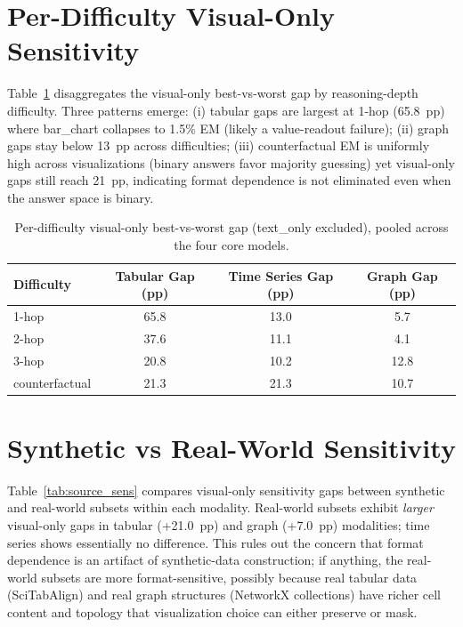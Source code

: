\documentclass{article}
\begin{document}
\section{Per-Difficulty Visual-Only Sensitivity}
\label{sec:per_diff_sens}
Table~\ref{tab:per_diff_sens} disaggregates the visual-only best-vs-worst gap by reasoning-depth difficulty. Three patterns emerge: (i) tabular gaps are largest at 1-hop (65.8~pp) where bar\_chart collapses to 1.5\% EM (likely a value-readout failure); (ii) graph gaps stay below 13~pp across difficulties; (iii) counterfactual EM is uniformly high across visualizations (binary answers favor majority guessing) yet visual-only gaps still reach 21~pp, indicating format dependence is not eliminated even when the answer space is binary.

\begin{table}[h]
\centering
\small
\caption{Per-difficulty visual-only best-vs-worst gap (text\_only excluded), pooled across the four core models.}
\label{tab:per_diff_sens}
\begin{tabular}{l ccc}
\toprule
Difficulty & Tabular Gap (pp) & Time Series Gap (pp) & Graph Gap (pp) \\
\midrule
1-hop          & 65.8 & 13.0 & 5.7 \\
2-hop          & 37.6 & 11.1 & 4.1 \\
3-hop          & 20.8 & 10.2 & 12.8 \\
counterfactual & 21.3 & 21.3 & 10.7 \\
\bottomrule
\end{tabular}
\end{table}

\section{Synthetic vs Real-World Sensitivity}
\label{sec:source_sens}
Table~\ref{tab:source_sens} compares visual-only sensitivity gaps between synthetic and real-world subsets within each modality. Real-world subsets exhibit \emph{larger} visual-only gaps in tabular (+21.0~pp) and graph (+7.0~pp) modalities; time series shows essentially no difference. This rules out the concern that format dependence is an artifact of synthetic-data construction; if anything, the real-world subsets are more format-sensitive, possibly because real tabular data (SciTabAlign) and real graph structures (NetworkX collections) have richer cell content and topology that visualization choice can either preserve or mask.
\end{document}
